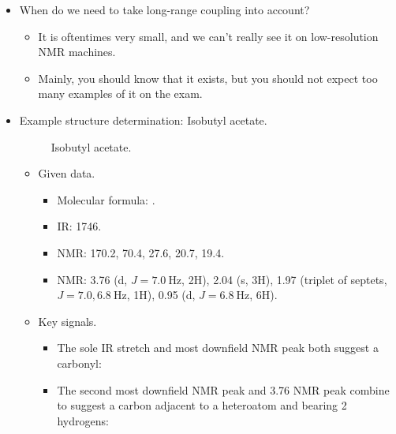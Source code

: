\documentclass[../notes.tex]{subfiles}
\begin{document}
\begin{itemize}
\begin{itemize}
\begin{itemize}
        \end{itemize}
    \end{itemize}
    \item When do we need to take long-range coupling into account?
    \begin{itemize}
        \item It is oftentimes very small, and we can't really see it on low-resolution NMR machines.
        \item Mainly, you should know that it exists, but you should not expect too many examples of it on the exam.
    \end{itemize}
    \item Example structure determination: Isobutyl acetate.
    \begin{figure}[H]
        \centering
        \footnotesize
        \caption{Isobutyl acetate.}
        \label{fig:iBuOAc}
    \end{figure}
    \begin{itemize}
        \item Given data.
        \begin{itemize}
            \item Molecular formula: .
            \item IR: 1746.
            \item {} NMR: 170.2, 70.4, 27.6, 20.7, 19.4.
            \item {} NMR: 3.76 (d, $J=\SI{7.0}{\hertz}$, 2H), 2.04 (s, 3H), 1.97 (triplet of septets, $J=\num{7.0},\SI{6.8}{\hertz}$, 1H), 0.95 (d, $J=\SI{6.8}{\hertz}$, 6H).
        \end{itemize}
        \item Key signals.
        \begin{itemize}
            \item The sole IR stretch and most downfield  NMR peak both suggest a carbonyl: {\tiny{}}
            \item The second most downfield  NMR peak and \SI{3.76}{\partspermillion}  NMR peak combine to suggest a carbon adjacent to a heteroatom and bearing 2 hydrogens: {\tiny{}}
            \begin{itemize}

\end{itemize}
\end{itemize}
\end{itemize}
\end{itemize}
\end{document}

